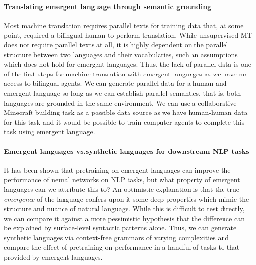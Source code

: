 \paragraph{Translating emergent language through semantic grounding}
Most machine translation requires parallel texts for training data that, at some point, required a bilingual human to perform translation.
While unsupervised MT does not require parallel texts at all, it is highly dependent on the parallel structure between two languages and their vocabularies, such an assumptions which does not hold for emergent languages.
Thus, the lack of parallel data is one of the first steps for machine translation with emergent languages as we have no access to bilingual agents.
We can generate parallel data for a human and emergent language so long as we can establish parallel semantics, that is, both languages are grounded in the same environment.
We can use a collaborative Minecraft building task as a possible data source as we have human-human data for this task and it would be possible to train computer agents to complete this task using emergent language.

\paragraph{Emergent languages vs.\@ synthetic languages for downstream NLP tasks}
It has been shown that pretraining on emergent languages can improve the performance of neural networks on NLP tasks, but what property of emergent languages can we attribute this to?
An optimistic explanation is that the true \emph{emergence} of the language confers upon it some deep properties which mimic the structure and nuance of natural language.
While this is difficult to test directly, we can compare it against a more pessimistic hypothesis that the difference can be explained by surface-level syntactic patterns alone.
Thus, we can generate synthetic languages via context-free grammars of varying complexities and compare the effect of pretraining on performance in a handful of tasks to that provided by emergent languages.

